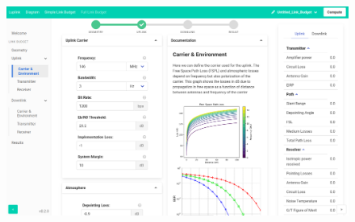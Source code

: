 \documentclass{beamer}
\begin{document}
\begin{frame}
	\begin{figure}
		\includegraphics[width=\textwidth]{screenshot2.png}
	\end{figure}
\end{frame}
\end{document}
